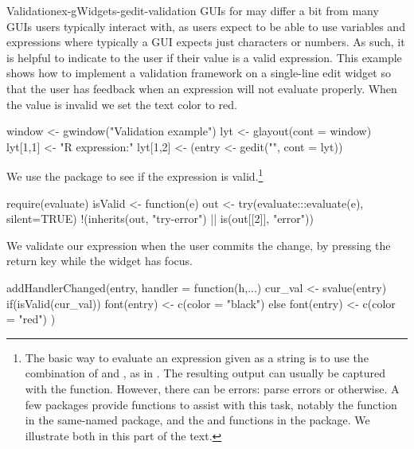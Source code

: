 \begin{example}{Validation}{ex-gWidgets-gedit-validation}
GUIs for \R\/ may differ a bit from many GUIs users typically
interact with, as \R\/ users expect to be able to use variables and
expressions where typically a GUI expects just characters or
numbers. As such, it is helpful to indicate to the user if their value
is a valid expression. This example shows how to implement a
validation framework on a single-line edit widget so that the user has
feedback when an expression will not evaluate properly.  When the
value is invalid we set the text color to red.


\begin{Schunk}
\begin{Sinput}
 window <- gwindow("Validation example")
 lyt <- glayout(cont = window)
 lyt[1,1] <- "R expression:"
 lyt[1,2] <- (entry <- gedit("", cont = lyt))
\end{Sinput}
\end{Schunk}


We use the  package to see
if the expression is valid.\footnote{The basic way to evaluate an
  \R{} expression given as a string is to use the combination of
   and , as in
  . The resulting output can usually be
  captured with the  function. However, there
  can be errors: parse errors or otherwise. A few packages provide
  functions to assist with this task, notably the 
  function in the same-named  package, and the
   and  functions in the
   package. We illustrate both in this part of the text.}
\begin{Schunk}
\begin{Sinput}
 require(evaluate)
 isValid <- function(e) {
   out <- try(evaluate:::evaluate(e), silent=TRUE)
   !(inherits(out, "try-error") ||  is(out[[2]], "error"))
 }
\end{Sinput}
\end{Schunk}
%

We validate our expression when the user commits the change, by
pressing the return key while the widget has focus. 


\begin{Schunk}
\begin{Sinput}
 addHandlerChanged(entry, handler = function(h,...) {
   cur_val <- svalue(entry)
   if(isValid(cur_val)) {
     font(entry) <- c(color = "black")
   } else {
     font(entry) <- c(color = "red")
   }
 })
\end{Sinput}
\end{Schunk}

\end{example}

